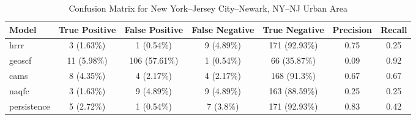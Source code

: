 \begin{table}[h!]
\centering
\begin{tabular}{lcccccc}
\hline
Model & True Positive & False Positive & False Negative & True Negative & Precision & Recall\\ \hline
hrrr & 3 (1.63\%) & 1 (0.54\%) & 9 (4.89\%) & 171 (92.93\%) & \cellcolor{red!25}0.75 & \cellcolor{red!25}0.25 \\ 
geoscf & 11 (5.98\%) & 106 (57.61\%) & 1 (0.54\%) & 66 (35.87\%) & \cellcolor{red!25}0.09 & \cellcolor{green!25}0.92 \\ 
cams & 8 (4.35\%) & 4 (2.17\%) & 4 (2.17\%) & 168 (91.3\%) & \cellcolor{red!25}0.67 & \cellcolor{green!25}0.67 \\ 
naqfc & 3 (1.63\%) & 9 (4.89\%) & 9 (4.89\%) & 163 (88.59\%) & \cellcolor{red!25}0.25 & \cellcolor{red!25}0.25 \\ 
persistence & 5 (2.72\%) & 1 (0.54\%) & 7 (3.8\%) & 171 (92.93\%) & 0.83 & 0.42 \\ 
\hline
\end{tabular}
\caption{Confusion Matrix for New York--Jersey City--Newark, NY--NJ Urban Area}
\end{table}
